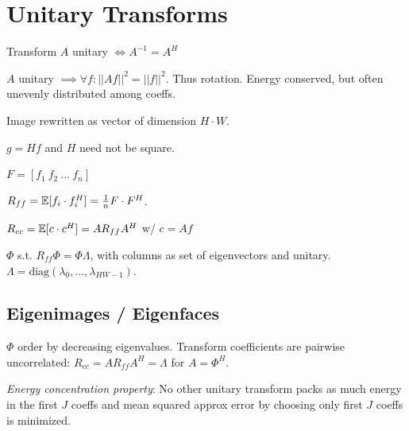 \section{Unitary Transforms}

\begin{definition}
  Transform \(A\) unitary \(\iff A^{-1} = A^H\)
\end{definition}

\begin{theorem}
  \(A\) unitary \(\implies \forall f: ||Af||^2 = ||f||^2\).
  Thus rotation. Energy conserved, but often unevenly distributed among coeffs.
\end{theorem}

\begin{definition}[Vectorization]
  Image rewritten as vector of dimension \(H \cdot W\). 
\end{definition}

\begin{definition}
  \(g = Hf\) and \(H\) need not be square.
\end{definition}

\begin{definition}
  \(F = [f_1 \ f_2 \ \ldots \ f_n]\)
\end{definition}

\begin{definition}
  \(R_{ff} = \operatorname{\mathbb{E}}[f_i \cdot f_i^H] = \frac{1}{n} F \cdot F^H\). 
\end{definition}

\begin{definition}
  \(R_{cc} = \operatorname{\mathbb{E}}[c \cdot c^H] = A R_{ff} A^H\) w/ \(c = Af\)
\end{definition}

\begin{definition}[Eigenmatrix of \(R_{ff}\)]
  \(\Phi\) s.t. \(R_{ff}\Phi = \Phi \Lambda\), with columns as set of eigenvectors and unitary. \(\Lambda = \text{diag}(\lambda_0, \ldots, \lambda_{HW - 1})\).
\end{definition}

\subsection{Eigenimages / Eigenfaces}

\begin{algorithm}
  \(\Phi\) order by decreasing eigenvalues. Transform coefficients are pairwise uncorrelated: \(R_{cc} = AR_{ff}A^H = \Lambda\) for \(A = \Phi^H\).

  \textit{Energy concentration property}: No other unitary transform packs as much energy in the first \(J\) coeffs and mean squared approx error by choosing only first \(J\) coeffs is minimized.
\end{algorithm}


